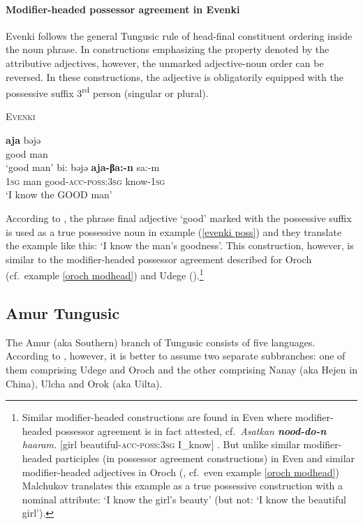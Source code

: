 \paragraph{Modifier-headed possessor agreement in Evenki} Evenki follows the general Tungusic rule of head-final constituent ordering inside the noun phrase. In constructions emphasizing the property denoted by the attributive adjectives, however, the unmarked adjective-noun order can be reversed. In these constructions, the adjective is obligatorily equipped with the possessive suffix 3\textsuperscript{rd} person (singular or plural).
\begin{exe}
\ex \textsc{Evenki} \citep[18]{bulatova-etal1999} 
\begin{xlist}
\ex	
\gll	\textbf{aja} bəjə\\
	good man\\
\glt	‘good man’
\ex	\label{evenki poss}
\gll	bi: bəjə \textbf{aja-βa:-n} sa:-m\\
	\textsc{1sg} man good-\textsc{acc}-\textsc{poss:3sg} know-\textsc{1sg}\\
\glt	‘I know the GOOD man’
\end{xlist}
\end{exe}
According to \citet[18]{bulatova-etal1999}, the phrase final adjective ‘good’ marked with the possessive suffix is used as a true possessive noun in example (\ref{evenki poss}) and they translate the example like this: ‘I know the man's goodness’. This construction, however, is similar to the modifier-headed possessor agreement described for Oroch (cf.~example \ref{oroch modhead}) and Udege (\citealt[485, elsewhere]{nikolaeva-etal2001}).\footnote{Similar modifier-headed constructions are found in Even where modifier-headed possessor agreement is in fact attested, cf.~\textit{Asatkan \textbf{nood-do-n} haaram.} [girl beautiful-\textsc{acc}-\textsc{poss:3sg} I\_know] \citep[11]{malchukov1995}. But unlike similar modifier-headed participles (in possessor agreement constructions) in Even \citep[31]{malchukov1995} and similar modifier-headed adjectives in Oroch (\citealt{malchukov2000}, cf.~even example \ref{oroch modhead}) Malchukov translates this example as a true possessive construction with a nominal attribute: ‘I know the girl's beauty’ (but not: ‘I know the beautiful girl’).}

\subsection{Amur Tungusic}
The Amur (aka Southern) branch of Tungusic consists of five languages. According to \citet[223]{salminen2007}, however, it is better to assume two separate subbranches: one of them comprising Udege and Oroch and the other comprising Nanay (aka Hejen in China), Ulcha and Orok (aka Uilta).

